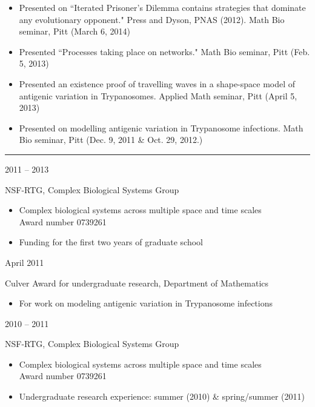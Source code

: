 \documentclass[a4paper,10pt]{article}
\newlength{\cvcolumngapwidth}
\newlength{\cvleftcolumnwidth}
\newlength{\cvrightcolumnwidth}
\newcommand{\cvsectionstyle}[1]{{\normalsize\cvsectionfont\textcolor{cvsectioncolor}{#1}}}
\newcommand{\cvtitlestyle}[1]{{\large\cvtitlefont\textcolor{cvtitlecolor}{#1}}}
\newcommand{\cvheadingstyle}[1]{{\normalsize\cvheadingfont\textcolor{cvheadingcolor}{#1}}}
\newlength{\cvafteritemskipamount}
\newlength{\cvaftersectionskipamount}
\newlength{\cvbetweensectionandheadingextraskipamount}
\newlength{\cvaftertitleskipamount}
\newlength{\cvparskip}
\newcommand{\cvsection}[1]{
    \begin{minipage}[t]{\cvleftcolumnwidth}
        \raggedleft\cvsectionstyle{#1}
    \end{minipage}%
    \hspace{\cvcolumngapwidth}%
    \begin{minipage}[t]{\cvrightcolumnwidth}
        \textcolor{cvrulecolor}{\rule{\cvrightcolumnwidth}{0.3mm}}
    \end{minipage}

    \vspace{\cvaftersectionskipamount}
}
\newcommand{\cvitem}[2]{
    \begin{minipage}[t]{\cvleftcolumnwidth}
        \raggedleft #1
    \end{minipage}%
    \hspace{\cvcolumngapwidth}%
    \begin{minipage}[t]{\cvrightcolumnwidth}
        \setlength{\parskip}{\cvparskip} #2
    \end{minipage}

    \vspace{\cvafteritemskipamount}
}
\newcommand{\cvtitle}[1]{
    \cvtitlestyle{#1}

    \vspace{\cvaftertitleskipamount}
    \vspace{-\cvparskip}
}
\begin{document}
{\begin{itemize}[leftmargin=*]
        \item Presented on ``Iterated Prisoner's Dilemma contains strategies that dominate any evolutionary opponent." Press and Dyson, PNAS (2012). Math Bio seminar, Pitt (March 6, 2014) \\
        \item Presented ``Processes taking place on networks." Math Bio seminar, Pitt (Feb. 5, 2013) \\
        \item Presented an existence proof of travelling waves in a shape-space model of antigenic variation in Trypanosomes. Applied Math seminar, Pitt (April 5, 2013) \\
        \item Presented on modelling antigenic variation in Trypanosome infections. Math Bio seminar, Pitt (Dec. 9, 2011 \& Oct. 29, 2012.) \\
    \end{itemize}

}


\cvsection{AWARDS \& FELLOWSHIPS}
\vspace{\cvbetweensectionandheadingextraskipamount}

\cvitem{
    \cvheadingstyle{2011 -- 2013}
}{
     \cvtitle{NSF-RTG, Complex Biological Systems Group}
    \begin{itemize}[leftmargin=*]

        \item Complex biological systems across multiple space and time scales \\ Award number 0739261
        \item Funding for the first two years of graduate school
    \end{itemize}
    
}


\cvitem{
    \cvheadingstyle{April 2011}
}{
    \cvtitle{Culver Award for undergraduate research, Department of Mathematics}
    \begin{itemize}[leftmargin=*]
	\item For work on modeling antigenic variation in Trypanosome infections
    \end{itemize}
    
}


\cvitem{
    \cvheadingstyle{2010 -- 2011}
}{
     \cvtitle{NSF-RTG, Complex Biological Systems Group}
    \begin{itemize}[leftmargin=*]

        \item Complex biological systems across multiple space and time scales \\ Award number 0739261
        \item Undergraduate research experience: summer (2010) \& spring/summer (2011)
    \end{itemize}
    
}
\end{document}
